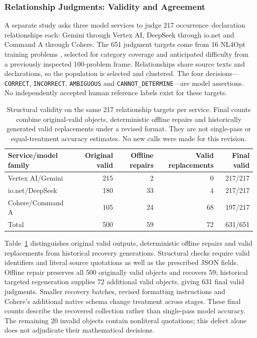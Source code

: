 \subsubsection{Relationship Judgments: Validity and Agreement}
\label{subsec:relationship-audit}
A separate study asks three model services to judge 217 occurrence--declaration relationships each: Gemini through Vertex AI, DeepSeek through io.net and Command A through Cohere. The 651 judgment targets come from 16 NL4Opt training problems \cite{ramamonjison2023nl4opt}, selected for category coverage and anticipated difficulty from a previously inspected 100-problem frame. Relationships share source texts and declarations, so the population is selected and clustered. The four decisions---\texttt{CORRECT}, \texttt{INCORRECT}, \texttt{AMBIGUOUS} and \texttt{CANNOT\_DETERMINE}---are model assertions. No independently accepted human reference labels exist for these targets.

\begin{table}[htbp]\centering\small
\caption{Structural validity on the same 217 relationship targets per service. Final counts combine original-valid objects, deterministic offline repairs and historically generated valid replacements under a revised format. They are not single-pass or equal-treatment accuracy estimates. No new calls were made for this revision.}\label{tab:relationship-validity}
\setlength{\tabcolsep}{3.5pt}
\begin{tabular}{@{}lrrrr@{}}\toprule
Service/model family & Original valid & Offline repairs & Valid replacements & Final valid\\\midrule
Vertex AI/Gemini & 215 & 2 & 0 & 217/217\\
io.net/DeepSeek & 180 & 33 & 4 & 217/217\\
Cohere/Command A & 105 & 24 & 68 & 197/217\\\midrule
Total & 500 & 59 & 72 & 631/651\\\bottomrule
\end{tabular}\end{table}

Table~\ref{tab:relationship-validity} distinguishes original valid outputs, deterministic offline repairs and valid replacements from historical recovery generations. Structural checks require valid identifiers and literal source quotations as well as the prescribed JSON fields. Offline repair preserves all 500 originally valid objects and recovers 59; historical targeted regeneration supplies 72 additional valid objects, giving 631 final valid judgments. Smaller recovery batches, revised formatting instructions and Cohere's additional native schema change treatment across stages. These final counts describe the recovered collection rather than single-pass model accuracy. The remaining 20 invalid objects contain nonliteral quotations; this defect alone does not adjudicate their mathematical decisions.

